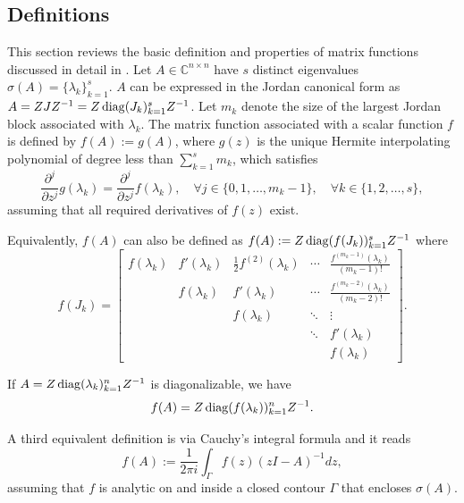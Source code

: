 \subsection{Definitions}
This section reviews the basic definition and properties of matrix functions
discussed in detail in \cite{higham2008functions}.
Let $A \in \mathbb{C}^{n \times n}$ have $s$ distinct eigenvalues $\sigma(A) = \{\lambda_k\}_{k=1}^{s}$.
$A$ can be expressed in the Jordan canonical form as $A = ZJZ^{-1} = Z \operatorname{diag}(J_k)_{k=1}^{s}
Z^{-1}$. Let $m_k$ denote the size of the largest Jordan block associated
with $\lambda_k$. The matrix function associated with a scalar function $f$
is defined by $f(A) := g(A)$, where $g(z)$ is the unique Hermite interpolating
polynomial of degree less than $\sum_{k=1}^{s}{m_k}$, which satisfies
\begin{equation}
    \frac{\partial^j}{\partial z^j}g(\lambda_k) = \frac{\partial^j}{\partial z^j}f(\lambda_k),
    \quad \forall j \in \{0, 1, \dots, m_k-1\},
    \quad \forall k \in \{1, 2, \dots, s\},
\end{equation}
assuming that all required derivatives of $f(z)$ exist.

Equivalently, $f(A)$ can also be defined as $f(A) := Z \operatorname{diag}(f(J_k))_{k=1}^{s} Z^{-1}$ where
\begin{equation*}
    f(J_k) =
    \begin{bmatrix}
    f(\lambda_k) & f'(\lambda_k)  & \frac{1}{2} f^{(2)}(\lambda_k) & \cdots & \frac{f^{(m_k-1)}(\lambda_k)}{(m_k - 1)!}\\
    & f(\lambda_k) & f'(\lambda_k) & \cdots & \frac{f^{(m_k-2)}(\lambda_k)}{(m_k - 2)!} \\
    &  & f(\lambda_k) & \ddots & \vdots \\
    &  &  & \ddots & f'(\lambda_k)\\
    &  &  &  & f(\lambda_k)
    \end{bmatrix}.
\end{equation*}

If $A = Z \operatorname{diag}(\lambda_k)_{k=1}^{n} Z^{-1}$ is diagonalizable, we have
\begin{equation}
    \label{eq:matrixfunctiondiagonal}
    f(A) = Z \operatorname{diag}(f(\lambda_k))_{k=1}^{n} Z^{-1}.
\end{equation}

A third equivalent definition is via Cauchy's integral formula and it reads
\begin{equation}
    f(A) := \frac{1}{2 \pi i} \int_{\Gamma}{f(z)(zI - A)^{-1} dz},
\end{equation}
assuming that $f$ is analytic on and inside a closed contour $\Gamma$ that encloses $\sigma(A)$.


